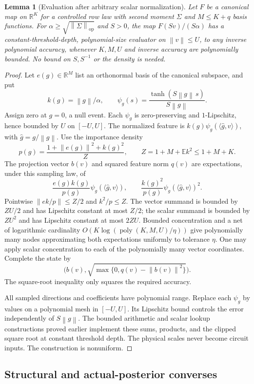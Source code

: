 \documentclass[11pt]{article}
\newtheorem{lemma}[theorem]{Lemma}
\theoremstyle{remark}
\newcommand{\R}{\mathbb R}
\newcommand{\E}{\mathbb E}
\newcommand{\poly}{\operatorname{poly}}
\newcommand{\norm}[1]{\left\lVert #1\right\rVert}
\begin{document}
\begin{lemma}[Evaluation after arbitrary scalar normalization]
\label{lem:prefactor-evaluation}
Let $F$ be a canonical map on $\R^K$ for a controlled row law
with second moment $\Sigma$ and $M\le K+q$ basis functions.
For $\alpha\ge\sqrt{\norm\Sigma_{\mathrm{op}}}$ and $S>0$,
the map $F(Sv)/(S\alpha)$ has a constant-threshold-depth,
polynomial-size evaluator on $\norm v\le U$, to any inverse
polynomial accuracy, whenever $K,M,U$ and inverse accuracy are
polynomially bounded. No bound on $S,S^{-1}$ or the density is
needed.
\end{lemma}
\begin{proof}
Let $e(g)\in\R^M$ list an orthonormal basis of the canonical
subspace, and put
\[
 k(g)=\norm g/\alpha,\qquad
 \psi_g(s)=\frac{\tanh(S\norm g\,s)}{S\norm g}.
\]
Assign zero at $g=0$, a null event. Each $\psi_g$ is
zero-preserving and $1$-Lipschitz, hence bounded by $U$ on
$[-U,U]$. The normalized feature is
$k(g)\psi_g(\langle\widehat g,v\rangle)$, with
$\widehat g=g/\norm g$. Use the importance density
\[
 p(g)=\frac{1+\norm{e(g)}^2+k(g)^2}{Z},\qquad
 Z=1+M+\E k^2\le1+M+K.
\]
The projection vector $b(v)$ and squared feature norm $q(v)$
are expectations, under this sampling law, of
\[
 \frac{e(g)k(g)}{p(g)}\psi_g(\langle\widehat g,v\rangle),
 \qquad
 \frac{k(g)^2}{p(g)}\psi_g(\langle\widehat g,v\rangle)^2.
\]
Pointwise $\norm{ek/p}\le Z/2$ and $k^2/p\le Z$.
The vector summand is bounded by $ZU/2$ and has Lipschitz
constant at most $Z/2$; the scalar summand is bounded by
$ZU^2$ and has Lipschitz constant at most $2ZU$.
Bounded concentration and a net of logarithmic cardinality
$O(K\log(\poly(K,M,U)/\eta))$ give polynomially many nodes
approximating both expectations uniformly to tolerance $\eta$.
One may apply scalar concentration to each of the polynomially
many vector coordinates. Complete the state by
\[
 \bigl(b(v),\sqrt{\max\{0,q(v)-\norm{b(v)}^2\}}\bigr).
\]
The square-root inequality only squares the required accuracy.

All sampled directions and coefficients have polynomial range.
Replace each $\psi_g$ by values on a polynomial mesh in
$[-U,U]$. Its Lipschitz bound controls the error independently
of $S\norm g$. The bounded arithmetic and scalar lookup
constructions proved earlier implement these sums, products,
and the clipped square root at constant threshold depth.
The physical scales never become circuit inputs. The
construction is nonuniform.
\end{proof}

\subsection{Structural and actual-posterior converses}
\end{document}
